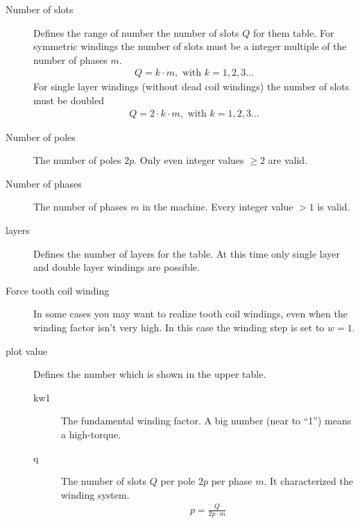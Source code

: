 \documentclass[]{scrreprt}
\begin{document}
\begin{description}
 \item[Number of slots] Defines the range of number the number of slots $Q$ for them
        table. For symmetric windings the number of slots must be a integer multiple 
        of the number of phases $m$.
        \begin{align}
        Q = k \cdot m, \text{ with }k = 1, 2, 3...
        \end{align} 
        For single layer windings (without dead coil windings) the number of slots must be doubled
        \begin{align}
        Q = 2 \cdot k \cdot m, \text{ with }k = 1, 2, 3...
        \end{align} 
 \item[Number of poles] The number of poles $2p$. Only even integer values $\geq2$ are valid.
 \item[Number of phases] The number of phases $m$ in the machine. Every integer value $>1$ is valid.
 \item[layers] Defines the number of layers for the table. At this time only single layer and
        double layer windings are possible.
 \item[Force tooth coil winding] In some cases you may want to realize tooth coil windings, 
        even when the winding factor isn't very high. In this case  the winding step is set to $w=1$. 
 \item[plot value] Defines the number which is shown in the upper table.
    \begin{description}
    \item[kw1] The fundamental winding factor. A big number (near to ``1'') means a high-torque.
    \item[q] The number of slots $Q$ per pole $2p$ per phase $m$. It characterized the winding system.
            \begin{align}
            p = \frac{Q}{2p\cdot m}
            \end{align} 
    

\end{description}
\end{description}
\end{document}
